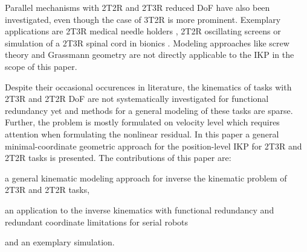 \documentclass[graybox,vecphys]{svmult}
\begin{document}
Parallel mechanisms with 2T2R and 2T3R reduced DoF have also been investigated, even though the case of 3T2R is more prominent. %
Exemplary applications are 2T3R medical needle holders \cite{KumarPicBay2014}, 2T2R oscillating screens  \cite{YeFanGuoQu2014} or simulation of a 2T3R spinal cord in bionics \cite{ZhuHuaZha2009}.
Modeling approaches like screw theory  and Grassmann geometry are not directly applicable to the IKP in the scope of this paper.

Despite their occasional occurences in literature, the kinematics of tasks with 2T3R and 2T2R DoF are not systematically investigated for functional redundancy yet and methods for a general modeling of these tasks are sparse. 
Further, the problem is mostly formulated on velocity level which requires attention when formulating the nonlinear residual.
In this paper a general minimal-coordinate geometric approach for the position-level IKP for 2T3R and 2T2R tasks is presented. 
%
%
The contributions of this paper are:
\begin{compactitem}
\item a general kinematic modeling approach for inverse the kinematic problem of 2T3R and 2T2R tasks,
\item an application to the inverse kinematics with functional redundancy and redundant coordinate limitations for serial robots 
\item and an exemplary simulation.
\end{compactitem} 
\end{document}
